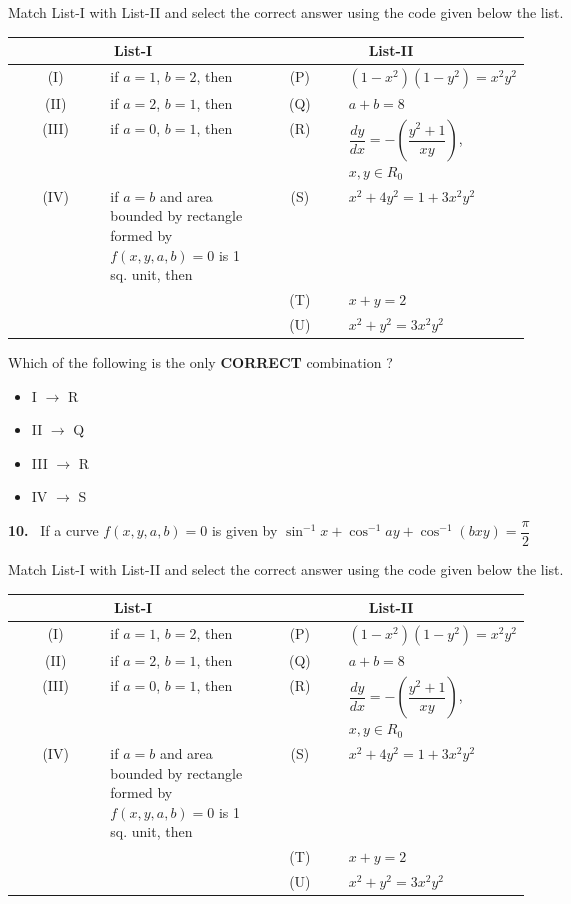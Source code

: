 \documentclass[10pt]{extarticle}
\newcommand{\qn}[1]{\par\smallskip\noindent\textbf{#1.}~}
\newenvironment{qoptions}{\begin{itemize}[leftmargin=1.8em,itemsep=1pt,topsep=2pt,label={}]}{\end{itemize}}
\newcommand{\opt}[2]{\item[(#1)] #2}
\begin{document}
\begin{multicols}{2}
Match List-I with List-II and select the correct answer using the code given below the list.\par
{\footnotesize\setlength{\tabcolsep}{2pt}\begin{tabular}{|c|p{0.3\linewidth}|c|p{0.3\linewidth}|}
\hline
\multicolumn{2}{|c|}{\textbf{List-I}} & \multicolumn{2}{c|}{\textbf{List-II}}\\ \hline
(I) & if $a=1$, $b=2$, then & (P) & $(1-x^2)(1-y^2)=x^2y^2$\\ \hline
(II) & if $a=2$, $b=1$, then & (Q) & $a+b=8$\\ \hline
(III) & if $a=0$, $b=1$, then & (R) & $\dfrac{dy}{dx}=-\left(\dfrac{y^2+1}{xy}\right)$, $x,y\in R_0$\\ \hline
(IV) & if $a=b$ and area bounded by rectangle formed by $f(x,y,a,b)=0$ is 1 sq. unit, then & (S) & $x^2+4y^2=1+3x^2y^2$\\ \hline
 & & (T) & $x+y=2$\\ \hline
 & & (U) & $x^2+y^2=3x^2y^2$\\ \hline
\end{tabular}}\par
Which of the following is the only \textbf{CORRECT} combination ?
\begin{qoptions}
\opt{A}{I $\to$ R}
\opt{B}{II $\to$ Q}
\opt{C}{III $\to$ R}
\opt{D}{IV $\to$ S}
\end{qoptions}
\qn{10} If a curve $f(x,y,a,b)=0$ is given by $\sin^{-1}x+\cos^{-1}ay+\cos^{-1}(bxy)=\dfrac\pi2$\par
Match List-I with List-II and select the correct answer using the code given below the list.\par
{\footnotesize\setlength{\tabcolsep}{2pt}\begin{tabular}{|c|p{0.3\linewidth}|c|p{0.3\linewidth}|}
\hline
\multicolumn{2}{|c|}{\textbf{List-I}} & \multicolumn{2}{c|}{\textbf{List-II}}\\ \hline
(I) & if $a=1$, $b=2$, then & (P) & $(1-x^2)(1-y^2)=x^2y^2$\\ \hline
(II) & if $a=2$, $b=1$, then & (Q) & $a+b=8$\\ \hline
(III) & if $a=0$, $b=1$, then & (R) & $\dfrac{dy}{dx}=-\left(\dfrac{y^2+1}{xy}\right)$, $x,y\in R_0$\\ \hline
(IV) & if $a=b$ and area bounded by rectangle formed by $f(x,y,a,b)=0$ is 1 sq. unit, then & (S) & $x^2+4y^2=1+3x^2y^2$\\ \hline
 & & (T) & $x+y=2$\\ \hline
 & & (U) & $x^2+y^2=3x^2y^2$\\ \hline

\end{tabular}}
\end{multicols}
\end{document}
